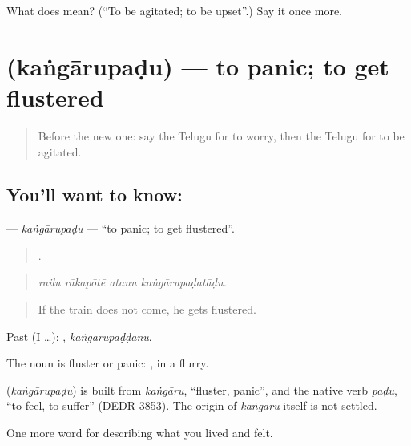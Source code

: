 \begin{tcolorbox}[breakable,colback=teal!4,colframe=teal!35!black,title={Before you move on}]
What does  mean? (\textquotedblleft{}To be agitated; to be upset\textquotedblright{}.) Say it once more.
\end{tcolorbox}
\section[\texorpdfstring{\te{కంగారుపడు} (kaṅgārupaḍu)}{కంగారుపడు (kaṅgārupaḍu)}]{ (kaṅgārupaḍu) — to panic; to get flustered}

\label{lesson:TE-C494-kangarupadu}



\begin{quote}
Before the new one: say the Telugu for to worry, then the Telugu for to be agitated.
\end{quote}

\subsection*{You'll want to know: }
\textbf{} — \emph{kaṅgārupaḍu} — \textquotedblleft{}to panic; to get flustered\textquotedblright{}.

\begin{quote}
   .
\end{quote}

\begin{quote}
\emph{railu rākapōtē atanu kaṅgārupaḍatāḍu.}
\end{quote}

\begin{quote}
If the train does not come, he gets flustered.
\end{quote}

Past (I …): , \emph{kaṅgārupaḍḍānu}.

The noun  is fluster or panic: , in a flurry.

\begin{cousinweb}
\textbf{} (\emph{kaṅgārupaḍu}) is built from \emph{kaṅgāru}, \textquotedblleft{}fluster, panic\textquotedblright{}, and the native verb \emph{paḍu}, \textquotedblleft{}to feel, to suffer\textquotedblright{} (DEDR 3853). The origin of \emph{kaṅgāru} itself is not settled.
\end{cousinweb}

\begin{grammarlens}[title={What you've built}]
One more word for describing what you lived and felt.
\end{grammarlens}

